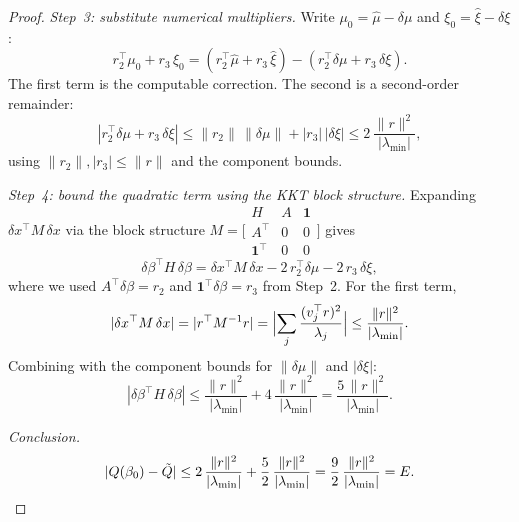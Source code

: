 \begin{unverified}
\begin{proof}
\emph{Step~3: substitute numerical multipliers.}
Write $\mu_0 = \hat\mu - \delta\mu$ and
$\xi_0 = \hat\xi - \delta\xi$:
\[
  r_2^\top\mu_0 + r_3\,\xi_0
  = (r_2^\top\hat\mu + r_3\,\hat\xi)
    - (r_2^\top\delta\mu + r_3\,\delta\xi).
\]
The first term is the computable correction.
The second is a second-order remainder:
\[
  |r_2^\top\delta\mu + r_3\,\delta\xi|
  \leq \|r_2\|\,\|\delta\mu\| + |r_3|\,|\delta\xi|
  \leq 2\,\frac{\|r\|^2}{|\lambda_{\min}|},
\]
using $\|r_2\|, |r_3| \leq \|r\|$
and the component bounds.

\emph{Step~4: bound the quadratic term
  using the KKT block structure.}
Expanding $\delta x^\top M\,\delta x$
via the block structure
$M = \bigl[\begin{smallmatrix}
  H & A & \mathbf{1} \\
  A^\top & 0 & 0 \\
  \mathbf{1}^\top & 0 & 0
\end{smallmatrix}\bigr]$
gives
\[
  \delta\beta^\top H\,\delta\beta
  = \delta x^\top M\,\delta x
    - 2\,r_2^\top\delta\mu
    - 2\,r_3\,\delta\xi,
\]
where we used $A^\top\delta\beta = r_2$
and $\mathbf{1}^\top\delta\beta = r_3$ from Step~2.
For the first term,
\[
  |\delta x^\top M\,\delta x|
  = |r^\top M^{-1} r|
  = \Bigl|\sum_j \frac{(v_j^\top r)^2}{\lambda_j}\Bigr|
  \leq \frac{\|r\|^2}{|\lambda_{\min}|}.
\]
Combining with the component bounds
for $\|\delta\mu\|$ and $|\delta\xi|$:
\[
  |\delta\beta^\top H\,\delta\beta|
  \leq \frac{\|r\|^2}{|\lambda_{\min}|}
    + 4\,\frac{\|r\|^2}{|\lambda_{\min}|}
  = \frac{5\,\|r\|^2}{|\lambda_{\min}|}.
\]

\emph{Conclusion.}
\[
  |Q(\beta_0) - \tilde Q|
  \leq 2\,\frac{\|r\|^2}{|\lambda_{\min}|}
    + \frac{5}{2}\,\frac{\|r\|^2}{|\lambda_{\min}|}
  = \frac{9}{2}\,\frac{\|r\|^2}{|\lambda_{\min}|}
  = E.
  \qedhere
\]
\end{proof}
\end{unverified}

